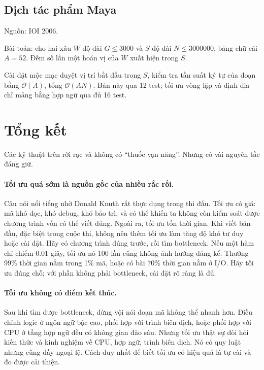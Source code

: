 \documentclass[11pt]{article}
\newcommand{\Oh}{\mathcal{O}}
\begin{document}
\subsection{Dịch tác phẩm Maya}

Nguồn: IOI 2006.

Bài toán: cho hai xâu \(W\) độ dài \(G\le 3000\) và \(S\) độ dài
\(N\le 3000000\), bảng chữ cái \(A=52\). Đếm số lần một hoán vị của \(W\)
xuất hiện trong \(S\).

Cài đặt mộc mạc duyệt vị trí bắt đầu trong \(S\), kiểm tra tần suất ký tự của
đoạn bằng \(\Oh(A)\), tổng \(\Oh(AN)\). Bản này qua 12 test; tối ưu vòng lặp
và định địa chỉ mảng bằng hợp ngữ qua đủ 16 test.

\section{Tổng kết}

Các kỹ thuật trên rời rạc và không có ``thuốc vạn năng''. Nhưng có vài nguyên
tắc đáng giữ.

\paragraph{Tối ưu quá sớm là nguồn gốc của nhiều rắc rối.}
Câu nói nổi tiếng nhờ Donald Knuth rất thực dụng trong thi đấu. Tối ưu có
giá: mã khó đọc, khó debug, khó bảo trì, và có thể khiến ta không còn kiểm
soát được chương trình vốn có thể viết đúng. Ngoài ra, tối ưu tốn thời gian.
Khi viết bản đầu, đặc biệt trong cuộc thi, không nên thêm tối ưu làm tăng độ
khó tư duy hoặc cài đặt. Hãy có chương trình đúng trước, rồi tìm bottleneck.
Nếu một hàm chỉ chiếm 0.01 giây, tối ưu nó 100 lần cũng không ảnh hưởng đáng
kể. Thường 99\% thời gian nằm trong 1\% mã, hoặc có bài 70\% thời gian nằm ở
I/O. Hãy tối ưu đúng chỗ; với phần không phải bottleneck, cài đặt rõ ràng là
đủ.

\paragraph{Tối ưu không có điểm kết thúc.}
Sau khi tìm được bottleneck, đừng vội nói đoạn mã không thể nhanh hơn. Điều
chỉnh logic ở ngôn ngữ bậc cao, phối hợp với trình biên dịch, hoặc phối hợp
với CPU ở tầng hợp ngữ đều có không gian đào sâu. Nhưng tối ưu thật sự đòi
hỏi kiến thức và kinh nghiệm về CPU, hợp ngữ, trình biên dịch. Nó có quy luật
nhưng cũng đầy ngoại lệ. Cách duy nhất để biết tối ưu có hiệu quả là tự cài
và đo được cải thiện.
\end{document}
